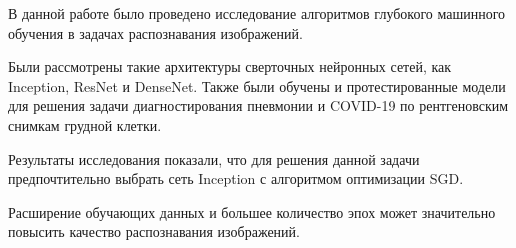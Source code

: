 В данной работе было проведено исследование алгоритмов глубокого машинного обучения в задачах распознавания изображений. 

Были рассмотрены такие архитектуры сверточных нейронных сетей, как Inception, ResNet и DenseNet. Также были обучены и протестированные модели для решения задачи диагностирования пневмонии и COVID-19 по рентгеновским снимкам грудной клетки. 

Результаты исследования показали, что для решения данной задачи предпочтительно выбрать сеть Inception с алгоритмом оптимизации SGD.
 
Расширение обучающих данных и большее количество эпох может значительно повысить качество распознавания изображений.

\clearpage